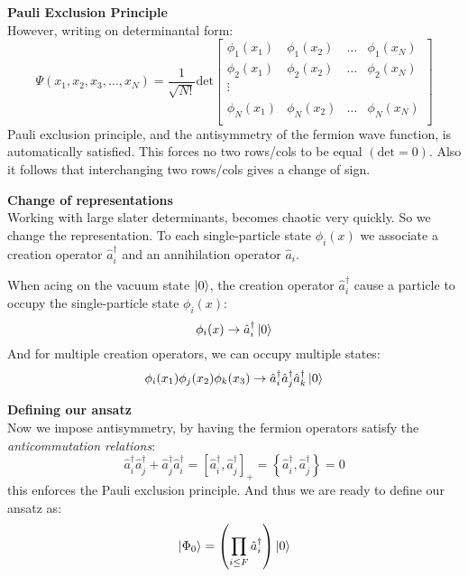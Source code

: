 \documentclass[UKenglish,aspectratio=169,12pt]{beamer}
\begin{document}
\begin{frame}
    \textbf{Pauli Exclusion Principle}\\
    However, writing on determinantal form:
    \[
        \Psi ( x_1,x_2,x_3,\dots ,x_N) = \frac{1}{\sqrt{N!}} \text{det} 
        \begin{bmatrix} 
         \phi_1 (x_1) & \phi_1(x_2) & \dots & \phi_1(x_N)\\ 
        \phi_2(x_1) & \phi_2 (x_2) & \dots & \phi_2(x_N)\\ 
         \vdots\\ \\
        \phi_N(x_1) & \phi_N(x_2) & \dots & \phi_N(x_N)\\ 
        \end{bmatrix}
    \]
    Pauli exclusion principle, and the antisymmetry of the fermion wave function, is automatically satisfied.
    This forces no two rows/cols to be equal $(\text{det}=0)$. Also it follows that interchanging two rows/cols gives a change of sign.
\end{frame}

\begin{frame}
    \textbf{Change of representations}\\
    Working with large slater determinants, becomes chaotic very quickly. So we change the representation.
    To each single-particle state $\phi_i(x)$ we associate a creation operator $\hat{a}^{\dagger} _i$ and an annihilation operator $\hat{a} _i$. 

    When acing on the vacuum state $\ket{ 0}$, the creation operator $\hat{a} ^{\dagger} _i$ cause a particle to occupy the single-particle state $\phi_i(x)$:
    \[
    \phi_i(x) \rightarrow \hat{a} ^{\dagger} _i \ket{0}
    \]
    And for multiple creation operators, we can occupy multiple states:
    \[
    \phi_i (x_1) \phi_j(x_2) \phi_k(x_3) \rightarrow \hat{a}^{\dagger}_i \hat{a}^{\dagger}_j \hat{a} ^{\dagger}_k \ket{0} 
    \]
  
\end{frame}

\begin{frame}
    \textbf{Defining our ansatz}\\
    Now we impose antisymmetry, by having the fermion operators satisfy the \textit{anticommutation relations}:
    \[
        \hat{a} ^{\dagger} _i \hat{a} ^{\dagger} _j  + \hat{a}_{j}^{\dagger} \hat{a}_{i}^{\dagger}= [\hat{a}^{\dagger}_i,\hat{a}^{\dagger}_j]_+ = \left\{\hat{a}^{\dagger}_i,\hat{a}^{\dagger}_j\right\} = 0
    \]
    this enforces the Pauli exclusion principle. And thus we are ready to define our ansatz as:
    \[
        \ket{\Phi_0} = \left(\prod_{i\leq F} \hat{a} ^{\dagger} _i\right) \ket{ 0}
    \]
\end{frame}
\end{document}
